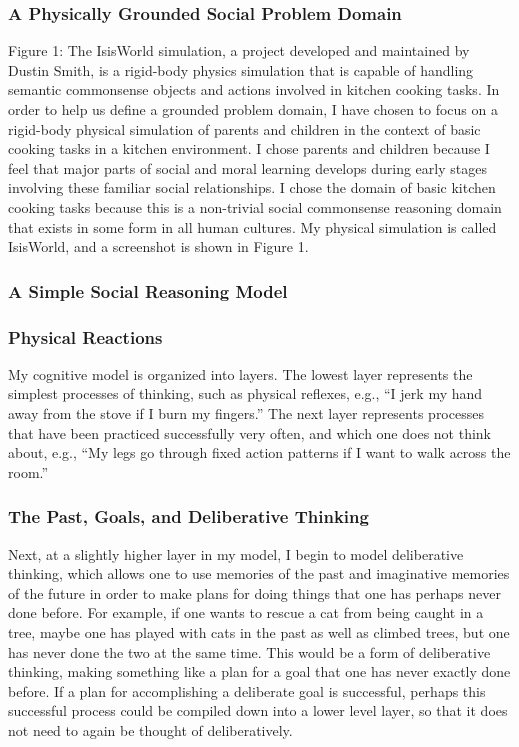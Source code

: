\subsubsection{A Physically Grounded Social Problem Domain}

Figure 1: The IsisWorld simulation, a project developed and maintained
by Dustin Smith, is a rigid-body physics simulation that is capable of
handling semantic commonsense objects and actions involved in kitchen
cooking tasks.  In order to help us define a grounded problem domain,
I have chosen to focus on a rigid-body physical simulation of parents
and children in the context of basic cooking tasks in a kitchen
environment. I chose parents and children because I feel that major
parts of social and moral learning develops during early stages
involving these familiar social relationships. I chose the domain of
basic kitchen cooking tasks because this is a non-trivial social
commonsense reasoning domain that exists in some form in all human
cultures. My physical simulation is called IsisWorld, and a
screenshot is shown in Figure 1.

\subsubsection{A Simple Social Reasoning Model}

\subsubsection{Physical Reactions}

My cognitive model is organized into layers. The lowest layer
represents the simplest processes of thinking, such as physical
reflexes, e.g., ``I jerk my hand away from the stove if I burn my
fingers.'' The next layer represents processes that have been practiced
successfully very often, and which one does not think about, e.g., ``My
legs go through fixed action patterns if I want to walk across the
room.''

\subsubsection{The Past, Goals, and Deliberative Thinking}

Next, at a slightly higher layer in my model, I begin to model
deliberative thinking, which allows one to use memories of the past
and imaginative memories of the future in order to make plans for
doing things that one has perhaps never done before. For example, if
one wants to rescue a cat from being caught in a tree, maybe one has
played with cats in the past as well as climbed trees, but one has
never done the two at the same time. This would be a form of
deliberative thinking, making something like a plan for a goal that
one has never exactly done before. If a plan for accomplishing a
deliberate goal is successful, perhaps this successful process could
be compiled down into a lower level layer, so that it does not need to
again be thought of deliberatively.

